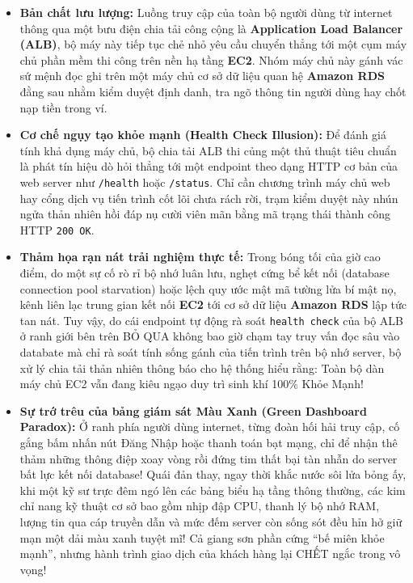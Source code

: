 \begin{itemize}
\tightlist
\item
  \textbf{Bản chất lưu lượng:} Luồng truy cập của toàn bộ người dùng từ
  internet thông qua một bưu điện chia tải công cộng là
  \textbf{Application Load Balancer (ALB)}, bộ máy này tiếp tục chẻ nhỏ
  yêu cầu chuyển thẳng tới một cụm máy chủ phần mềm thi công trên nền hạ
  tầng \textbf{EC2}. Nhóm máy chủ này gánh vác sứ mệnh đọc ghi trên một
  máy chủ cơ sở dữ liệu quan hệ \textbf{Amazon RDS} đằng sau nhằm kiểm
  duyệt định danh, tra ngõ thông tin người dùng hay chốt nạp tiền trong
  ví.
\item
  \textbf{Cơ chế ngụy tạo khỏe mạnh (Health Check Illusion):} Để đánh
  giá tính khả dụng máy chủ, bộ chia tải ALB thi củng một thủ thuật tiêu
  chuẩn là phát tín hiệu dò hỏi thẳng tới một endpoint theo dạng HTTP cơ
  bản của web server như \texttt{/\allowbreak{}health} hoặc \texttt{/\allowbreak{}status}. Chỉ cần
  chương trình máy chủ web hay cổng dịch vụ tiến trình cốt lõi chưa rách
  rời, trạm kiểm duyệt này nhún ngửa thản nhiên hồi đáp nụ cười viên mãn
  bằng mã trạng thái thành công HTTP \texttt{200\ OK}.
\item
  \textbf{Thảm họa rạn nát trải nghiệm thực tế:} Trong bóng tối của giờ
  cao điểm, do một sự cố rò rỉ bộ nhớ luân lưu, nghẹt cứng bể kết nối
  (database connection pool starvation) hoặc lệch quy ước mật mã tường
  lửa bí mật nọ, kênh liên lạc trung gian kết nối \textbf{EC2} tới cơ sở
  dữ liệu \textbf{Amazon RDS} lập tức tan nát. Tuy vậy, do cái endpoint
  tự động rà soát \texttt{health\ check} của bộ ALB ở ranh giới bên trên
  BỎ QUA không bao giờ chạm tay truy vấn đọc sâu vào databate mà chỉ rà
  soát tính sống gánh của tiến trình trên bộ nhớ server, bộ xử lý chia
  tải thản nhiên thông báo cho hệ thống hiểu rằng: Toàn bộ dàn máy chủ
  EC2 vẫn đang kiêu ngạo duy trì sinh khí 100\% Khỏe Mạnh!
\item
  \textbf{Sự trớ trêu của bảng giám sát Màu Xanh (Green Dashboard
  Paradox):} Ở ranh phía người dùng internet, từng đoàn hối hải truy
  cập, cố gắng bấm nhấn nút Đăng Nhập hoặc thanh toán bạt mạng, chỉ để
  nhận thê thảm những thông điệp xoay vòng rồi đứng tim thất bại tàn
  nhẫn do server bất lực kết nối database! Quái đản thay, ngay thời khắc
  nước sôi lửa bỏng ấy, khi một kỹ sư trực đêm ngó lên các bảng biểu hạ
  tầng thông thường, các kim chỉ nang kỹ thuật cơ sở bao gồm nhịp đập
  CPU, thanh lý bộ nhớ RAM, lượng tin qua cáp truyền dẫn và mức đếm
  server còn sống sót đều hỉn hở giữ mạn một dải màu xanh tuyệt mĩ! Cả
  giang sơn phần cứng ``bế miên khỏe mạnh'', nhưng hành trình giao dịch
  của khách hàng lại CHẾT ngắc trong vô vọng!
\end{itemize}

